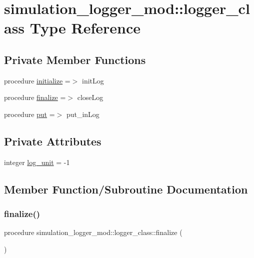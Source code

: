 \hypertarget{structsimulation__logger__mod_1_1logger__class}{}\section{simulation\+\_\+logger\+\_\+mod\+:\+:logger\+\_\+class Type Reference}
\label{structsimulation__logger__mod_1_1logger__class}
\subsection*{Private Member Functions}
\begin{DoxyCompactItemize}
\item 
procedure \hyperlink{structsimulation__logger__mod_1_1logger__class_ade4c1c34641ac20778c7d4f1e2e1cd81}{initialize} =$>$ init\+Log
\item 
procedure \hyperlink{structsimulation__logger__mod_1_1logger__class_a46fc11fd1e42d174205e06a05c223489}{finalize} =$>$ close\+Log
\item 
procedure \hyperlink{structsimulation__logger__mod_1_1logger__class_ae99085dc817bbb52855ab4bbd71d1a57}{put} =$>$ put\+\_\+in\+Log
\end{DoxyCompactItemize}
\subsection*{Private Attributes}
\begin{DoxyCompactItemize}
\item 
integer \hyperlink{structsimulation__logger__mod_1_1logger__class_a6b7412c0a809c5c2e63edd967d1d2f11}{log\+\_\+unit} = -\/1
\end{DoxyCompactItemize}


\subsection{Member Function/\+Subroutine Documentation}
\mbox{\label{structsimulation__logger__mod_1_1logger__class_a46fc11fd1e42d174205e06a05c223489}} 
\subsubsection{\texorpdfstring{finalize()}{finalize()}}
{\footnotesize\ttfamily procedure simulation\+\_\+logger\+\_\+mod\+::logger\+\_\+class\+::finalize (\begin{DoxyParamCaption}{ }\end{DoxyParamCaption})\hspace{0.3cm}{\ttfamily [private]}}


